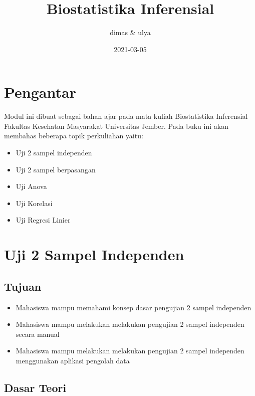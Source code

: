 \documentclass[
]{book}
\title{Biostatistika Inferensial}
\author{dimas \& ulya}
\date{2021-03-05}
\providecommand{\tightlist}{%
  \setlength{\itemsep}{0pt}\setlength{\parskip}{0pt}}
\begin{document}
\maketitle

{
\setcounter{tocdepth}{1}
\tableofcontents
}
\hypertarget{pengantar}{%
\chapter{Pengantar}\label{pengantar}}

Modul ini dibuat sebagai bahan ajar pada mata kuliah Biostatistika Inferensial Fakultas Kesehatan Masyarakat Universitas Jember. Pada buku ini akan membahas beberapa topik perkuliahan yaitu:

\begin{itemize}
\tightlist
\item
  Uji 2 sampel independen
\item
  Uji 2 sampel berpasangan
\item
  Uji Anova
\item
  Uji Korelasi
\item
  Uji Regresi Linier
\end{itemize}

\hypertarget{uji2sampelind}{%
\chapter{Uji 2 Sampel Independen}\label{uji2sampelind}}

\hypertarget{tujuan}{%
\section{Tujuan}\label{tujuan}}

\begin{itemize}
\tightlist
\item
  Mahasiswa mampu memahami konsep dasar pengujian 2 sampel independen
\item
  Mahasiswa mampu melakukan melakukan pengujian 2 sampel independen secara manual
\item
  Mahasiswa mampu melakukan melakukan pengujian 2 sampel independen menggunakan aplikasi pengolah data
\end{itemize}

\hypertarget{dasar-teori}{%
\section{Dasar Teori}\label{dasar-teori}}
\end{document}
